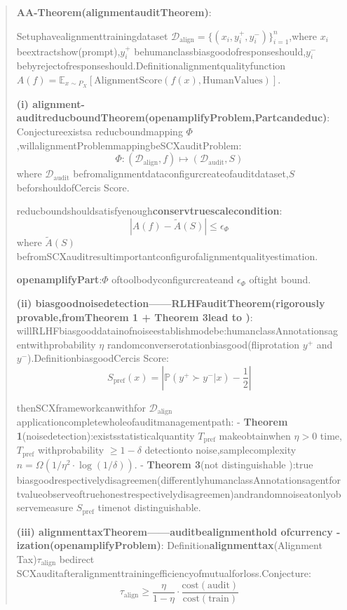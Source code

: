 \documentclass[
  12pt,
]{article}
\begin{document}
\begin{quote}
\textbf{AA-Theorem(alignmentauditTheorem)}:

Setuphavealignmenttrainingdataset
\(\mathcal{D}_{\text{align}} = \{(x_i, y_i^+, y_i^-)\}_{i=1}^n\),where
\(x_i\) beextractshow(prompt),\(y_i^+\) behumanclassbiasgoodofresponseshould,\(y_i^-\)
bebyrejectofresponseshould.Definitionalignmentqualityfunction
\(A(f) = \mathbb{E}_{x \sim P_X}[\text{AlignmentScore}(f(x), \text{HumanValues})]\).

\textbf{(i) alignment-auditreducboundTheorem(openamplifyProblem,Partcandeduc)}:
Conjectureexistsa  reducboundmapping \(\Phi\),willalignmentProblemmappingbeSCXauditProblem:
\[\Phi: (\mathcal{D}_{\text{align}}, f) \mapsto (\mathcal{D}_{\text{audit}}, S)\]
where \(\mathcal{D}_{\text{audit}}\) befromalignmentdataconfigurcreateofauditdataset,\(S\)
beforshouldofCercis Score.

reducboundshouldsatisfyenough\textbf{conservtruescalecondition}:
\[|A(f) - \tilde{A}(S)| \leq \epsilon_{\Phi}\] where \(\tilde{A}(S)\)
befromSCXauditresultimportantconfigurofalignmentqualityestimation.

\textbf{openamplifyPart}:\(\Phi\) oftoolbodyconfigurcreateand \(\epsilon_{\Phi}\) oftight bound.

\textbf{(ii) biasgoodnoisedetection------RLHFauditTheorem(rigorously provable,fromTheorem 1 +
Theorem 3lead to )}: willRLHFbiasgooddatainofnoiseestablishmodebe:humanclassAnnotationsagentwithprobability
\(\eta\) randomconverserotationbiasgood(fliprotation \(y^+\) and \(y^-\)).DefinitionbiasgoodCercis Score:
\[S_{\text{pref}}(x) = \left|\mathbb{P}(y^+ \succ y^- | x) - \frac{1}{2}\right|\]

thenSCXframeworkcanwithfor \(\mathcal{D}_{\text{align}}\) applicationcompletewholeofauditmanagementpath: -
\textbf{Theorem 1}(noisedetection):existsstatisticalquantity \(T_{\text{pref}}\) makeobtainwhen
\(\eta > 0\) time,\(T_{\text{pref}}\) withprobability \(\geq 1-\delta\)
detectionto noise,samplecomplexity \(n = \Omega(1/\eta^2 \cdot \log(1/\delta))\). -
\textbf{Theorem
3}(not distinguishable ):true biasgoodrespectivelydisagreemen(differentlyhumanclassAnnotationsagentfortvalueobserveoftruehonestrespectivelydisagreemen)andrandomnoiseatonlyobservemeasure
\(S_{\text{pref}}\) timenot distinguishable.

\textbf{(iii) alignmenttaxTheorem------auditbealignmenthold ofcurrency -ization(openamplifyProblem)}:
Definition\textbf{alignmenttax}(Alignment Tax)\(\tau_{\text{align}}\)
bedirect SCXauditafteralignmenttrainingefficiencyofmutualforloss.Conjecture:
\[\tau_{\text{align}} \geq \frac{\eta}{1-\eta} \cdot \frac{\text{cost}(\text{audit})}{\text{cost}(\text{train})}\]


\end{quote}
\end{document}
